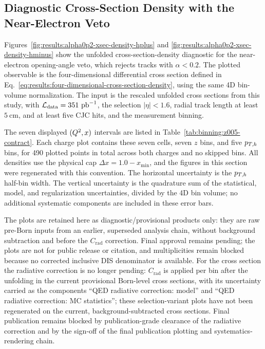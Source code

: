 \subsection{Diagnostic Cross-Section Density with the Near-Electron Veto}
\label{sec:results:diagnostic-alpha0p2-cross-section-density}

Figures~\ref{fig:results:alpha0p2-xsec-density-hplus} and
\ref{fig:results:alpha0p2-xsec-density-hminus} show the unfolded
cross-section-density diagnostic for the near-electron opening-angle veto,
which rejects tracks with $\alpha<0.2$.  The plotted observable is the
four-dimensional differential cross section defined in
Eq.~\ref{eq:results:four-dimensional-cross-section-density}, using the same 4D
bin-volume normalization.  The input is the rescaled unfolded cross sections from this
study, with $\mathcal{L}_{\mathrm{data}}=351~\text{pb}^{-1}$, the selection
$|\eta|<1.6$, radial track length at least $5~\mathrm{cm}$, and at least five
CJC hits, and the measurement binning.

The seven displayed $(Q^{2},x)$ intervals are listed in
Table~\ref{tab:binning:z005-contract}. Each charge plot contains these seven
cells, seven $z$ bins, and five $p_{T,h}$ bins, for 490 plotted points in total
across both charges and no skipped bins. All densities use the physical cap
$\Delta x=1.0-x_{\min}$, and the figures in this section were regenerated
with this convention.
The horizontal uncertainty is the $p_{T,h}$ half-bin width.  The vertical
uncertainty is the quadrature sum of the statistical, model, and
regularization uncertainties, divided by the 4D bin volume; no additional
systematic components are included in these error bars.

The plots are retained here as diagnostic/provisional products only: they are
raw pre-Born inputs from an earlier, superseded analysis chain, without
background subtraction and before the $C_{\mathrm{rad}}$ correction.
Final approval remains pending; the plots are not for public release or
citation, and multiplicities remain blocked because no corrected inclusive DIS
denominator is available. For the cross section the radiative correction is no
longer pending: $C_{\mathrm{rad}}$ is applied per bin after the unfolding in the
current provisional Born-level cross sections, with its uncertainty carried as the
components ``QED radiative correction: model'' and ``QED radiative correction: MC statistics'';
these selection-variant plots have not been regenerated on the current,
background-subtracted cross sections.  Final publication remains blocked by
publication-grade clearance of the radiative correction and by the
sign-off of the final publication plotting and systematics-rendering
chain.


